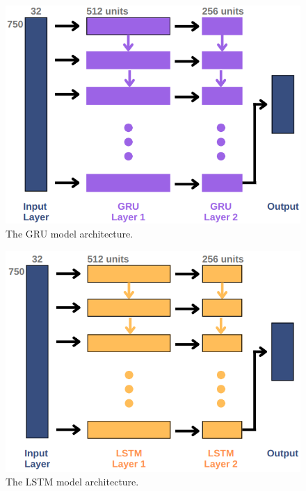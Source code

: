 \documentclass[format=sigconf, nonacm=true, review=true, screen=true]{acmart}
\begin{document}
\begin{figure}[H]
    \centering
    \includegraphics[width=\columnwidth]{figures/gru-arch.png}
    \caption{The GRU model architecture.}
    \label{fig:gru-arch}
\end{figure}

\begin{figure}[H]
    \centering
    \includegraphics[width=\columnwidth]{figures/lstm-arch.png}
    \caption{The LSTM model architecture.}
    \label{fig:lstm-arch}
\end{figure}
\end{document}

